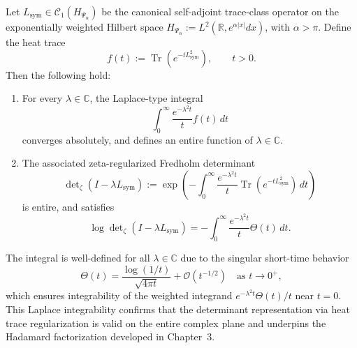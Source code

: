\begin{lemma}
\label{lem:laplace-integrability-heat-trace}
Let \( L_{\mathrm{sym}} \in \mathcal{C}_1(H_{\Psi_\alpha}) \) be the canonical self-adjoint trace-class operator on the exponentially weighted Hilbert space \( H_{\Psi_\alpha} := L^2(\mathbb{R}, e^{\alpha|x|} dx) \), with \( \alpha > \pi \). Define the heat trace
\[
f(t) := \operatorname{Tr}\left(e^{-t L_{\mathrm{sym}}^2}\right), \qquad t > 0.
\]
Then the following hold:
\begin{enumerate}
    \item For every \( \lambda \in \mathbb{C} \), the Laplace-type integral
    \[
    \int_0^\infty \frac{e^{-\lambda^2 t}}{t} f(t)\, dt
    \]
    converges absolutely, and defines an entire function of \( \lambda \in \mathbb{C} \).
    
    \item The associated zeta-regularized Fredholm determinant
    \[
    \det\nolimits_{\zeta}(I - \lambda L_{\mathrm{sym}}) := \exp\left( -\int_0^\infty \frac{e^{-\lambda^2 t}}{t} \operatorname{Tr}\left(e^{-t L_{\mathrm{sym}}^2}\right) \, dt \right)
    \]
    is entire, and satisfies
    \[
    \log \det\nolimits_{\zeta}(I - \lambda L_{\mathrm{sym}}) = - \int_0^\infty \frac{e^{-\lambda^2 t}}{t} \Theta(t)\, dt.
    \]
\end{enumerate}
\noindent
The integral is well-defined for all \( \lambda \in \mathbb{C} \) due to the singular short-time behavior
\[
\Theta(t) = \frac{\log(1/t)}{\sqrt{4\pi t}} + \mathcal{O}(t^{-1/2}) \quad \text{as } t \to 0^+,
\]
which ensures integrability of the weighted integrand \( e^{-\lambda^2 t} \Theta(t)/t \) near \( t = 0 \). This Laplace integrability confirms that the determinant representation via heat trace regularization is valid on the entire complex plane and underpins the Hadamard factorization developed in Chapter~3.
\end{lemma}
